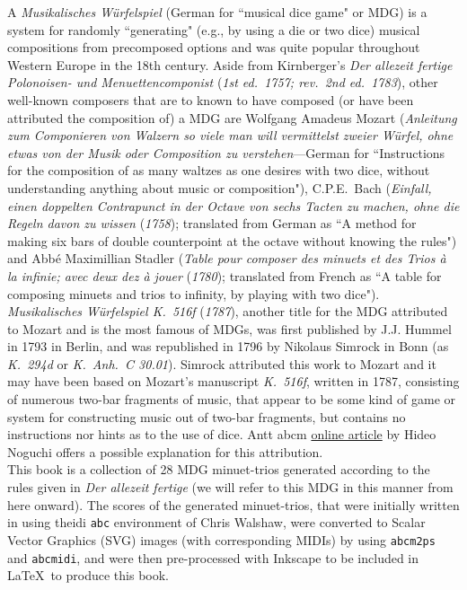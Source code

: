 \documentclass[a4paper,x11names,svgnames,10pt]{article}
\begin{document}
A {\it Musikalisches W\"{u}rfelspiel} (German for ``musical dice game" or MDG) is a system for randomly ``generating" (e.g., by using a die or two dice) musical compositions from precomposed options and was quite popular throughout Western Europe in the 18th century. Aside from Kirnberger's {\em Der allezeit fertige Polonoisen- und Menuettencomponist} ({\it 1st ed.\ 1757; rev.\ 2nd ed.\ 1783}), other well-known composers that are to known to have composed  (or have been attributed the composition of) a MDG are Wolfgang Amadeus Mozart ({\em Anleitung zum Componieren von Walzern so viele man will vermittelst zweier Würfel, ohne etwas von der Musik oder Composition zu verstehen}---German for ``Instructions for the composition of as many waltzes as one desires with two dice, without understanding anything about music or composition"), C.P.E.\ Bach ({\em Einfall, einen doppelten Contrapunct in der Octave von sechs Tacten zu machen, ohne die Regeln davon zu wissen} ({\it 1758}); translated from German as ``A method for making six bars of double counterpoint at the octave without knowing the rules") and Abb\'{e} Maximillian Stadler ({\em Table pour composer des minuets et des Trios \`{a} la infinie; avec deux dez \`{a} jouer} ({\it 1780}); translated from French as ``A table for composing minuets and trios to infinity, by playing with two dice"). \\

{\it Musikalisches W\"{u}rfelspiel K.\ 516f} ({\it 1787}), another title for the MDG attributed to Mozart and is the most famous of MDGs, was first published by J.J. Hummel in 1793 in Berlin, and was republished in 1796 by Nikolaus Simrock in Bonn (as {\em K.\ 294d} or {\em K.\ Anh.\ C 30.01}).  Simrock attributed this work to Mozart and it may have been based on Mozart's manuscript {\em K.\ 516f}, written in 1787, consisting of numerous two-bar fragments of music, that appear to be some kind of game or system for constructing music out of two-bar fragments, but contains no instructions nor hints as to the use of dice.  Antt abcm \href{(http://www.asahi-net.or.jp/\~rb5h-ngc/e/k516f.htm}{online article} by Hideo Noguchi offers a possible explanation for this attribution. \\

This book is a collection of 28 MDG minuet-trios generated according to the rules given in {\it Der allezeit fertige} (we will refer to this MDG in this manner from here onward).  The scores of the generated minuet-trios, that were initially written in using theidi \texttt{abc} environment of Chris Walshaw, were converted to Scalar Vector Graphics (SVG) images (with corresponding MIDIs) by using {\tt abcm2ps } and {\tt abcmidi}, and were then pre-processed with Inkscape to be included in \LaTeX\ to produce this book.
\end{document}
